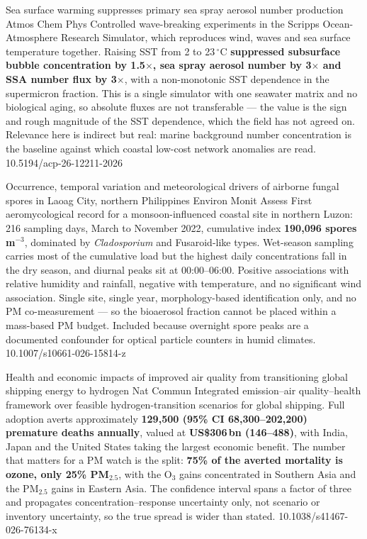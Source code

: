 \documentclass[10pt]{article}
\begin{document}
{Sea surface warming suppresses primary sea spray aerosol number production}
{Atmos Chem Phys}
{Controlled wave-breaking experiments in the Scripps Ocean-Atmosphere Research Simulator,
which reproduces wind, waves and sea surface temperature together. Raising SST from 2 to
23\,$^\circ$C \textbf{suppressed subsurface bubble concentration by 1.5$\times$, sea
spray aerosol number by 3$\times$ and SSA number flux by 3$\times$}, with a
non-monotonic SST dependence in the supermicron fraction. This is a single simulator with
one seawater matrix and no biological aging, so absolute fluxes are not transferable ---
the value is the sign and rough magnitude of the SST dependence, which the field has not
agreed on. Relevance here is indirect but real: marine background number concentration is
the baseline against which coastal low-cost network anomalies are read.}
{10.5194/acp-26-12211-2026}

{Occurrence, temporal variation and meteorological drivers of airborne fungal spores in
Laoag City, northern Philippines}
{Environ Monit Assess}
{First aeromycological record for a monsoon-influenced coastal site in northern Luzon:
216 sampling days, March to November 2022, cumulative index \textbf{190{,}096
spores\,m$^{-3}$}, dominated by \textit{Cladosporium} and Fusaroid-like types. Wet-season
sampling carries most of the cumulative load but the highest daily concentrations fall in
the dry season, and diurnal peaks sit at 00:00--06:00. Positive associations with relative
humidity and rainfall, negative with temperature, and no significant wind association.
Single site, single year, morphology-based identification only, and no PM co-measurement
--- so the bioaerosol fraction cannot be placed within a mass-based PM budget. Included
because overnight spore peaks are a documented confounder for optical particle counters
in humid climates.}
{10.1007/s10661-026-15814-z}

\clearpage


{Health and economic impacts of improved air quality from transitioning global shipping
energy to hydrogen}
{Nat Commun}
{Integrated emission--air quality--health framework over feasible hydrogen-transition
scenarios for global shipping. Full adoption averts approximately \textbf{129{,}500
(95\% CI 68{,}300--202{,}200) premature deaths annually}, valued at \textbf{US\$306\,bn
(146--488)}, with India, Japan and the United States taking the largest economic
benefit. The number that matters for a PM watch is the split: \textbf{75\% of the averted
mortality is ozone, only 25\% PM$_{2.5}$}, with the O$_3$ gains concentrated in Southern
Asia and the PM$_{2.5}$ gains in Eastern Asia. The confidence interval spans a factor of
three and propagates concentration--response uncertainty only, not scenario or
inventory uncertainty, so the true spread is wider than stated.}
{10.1038/s41467-026-76134-x}
\end{document}
